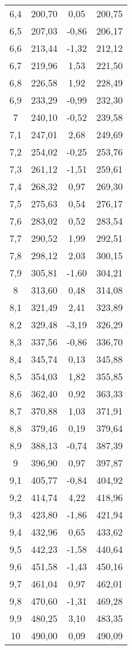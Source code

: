 \documentclass{article}
\begin{document}
\begin{longtable}[c]{|c|c|c|c|}
6,4 & 200,70 & 0,05 & 200,75\\
6,5 & 207,03 & -0,86 & 206,17\\
6,6 & 213,44 & -1,32 & 212,12\\
6,7 & 219,96 & 1,53 & 221,50\\
6,8 & 226,58 & 1,92 & 228,49\\
6,9 & 233,29 & -0,99 & 232,30\\
7 & 240,10 & -0,52 & 239,58\\
7,1 & 247,01 & 2,68 & 249,69\\
7,2 & 254,02 & -0,25 & 253,76\\
7,3 & 261,12 & -1,51 & 259,61\\
7,4 & 268,32 & 0,97 & 269,30\\
7,5 & 275,63 & 0,54 & 276,17\\
7,6 & 283,02 & 0,52 & 283,54\\
7,7 & 290,52 & 1,99 & 292,51\\
7,8 & 298,12 & 2,03 & 300,15\\
7,9 & 305,81 & -1,60 & 304,21\\
8 & 313,60 & 0,48 & 314,08\\
8,1 & 321,49 & 2,41 & 323,89\\
8,2 & 329,48 & -3,19 & 326,29\\
8,3 & 337,56 & -0,86 & 336,70\\
8,4 & 345,74 & 0,13 & 345,88\\
8,5 & 354,03 & 1,82 & 355,85\\
8,6 & 362,40 & 0,92 & 363,33\\
8,7 & 370,88 & 1,03 & 371,91\\
8,8 & 379,46 & 0,19 & 379,64\\
8,9 & 388,13 & -0,74 & 387,39\\
9 & 396,90 & 0,97 & 397,87\\
9,1 & 405,77 & -0,84 & 404,92\\
9,2 & 414,74 & 4,22 & 418,96\\
9,3 & 423,80 & -1,86 & 421,94\\
9,4 & 432,96 & 0,65 & 433,62\\
9,5 & 442,23 & -1,58 & 440,64\\
9,6 & 451,58 & -1,43 & 450,16\\
9,7 & 461,04 & 0,97 & 462,01\\
9,8 & 470,60 & -1,31 & 469,28\\
9,9 & 480,25 & 3,10 & 483,35\\
10 & 490,00 & 0,09 & 490,09\\
 \end{longtable}
\end{document}
